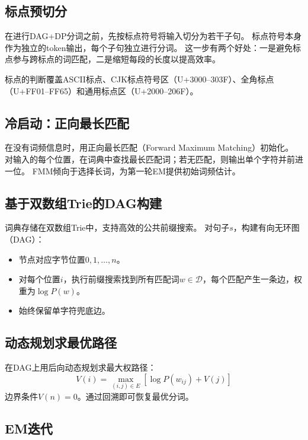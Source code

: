 \documentclass[11pt,a4paper]{article}
\begin{document}
\subsection{标点预切分}

在进行DAG+DP分词之前，先按标点符号将输入切分为若干子句。
标点符号本身作为独立的token输出，每个子句独立进行分词。
这一步有两个好处：一是避免标点参与跨标点的词匹配，二是缩短每段的长度以提高效率。

标点的判断覆盖ASCII标点、CJK标点符号区（U+3000--303F）、全角标点（U+FF01--FF65）和通用标点区（U+2000--206F）。

\subsection{冷启动：正向最长匹配}

在没有词频信息时，用正向最长匹配（Forward Maximum Matching）初始化。
对输入的每个位置，在词典中查找最长匹配词；若无匹配，则输出单个字符并前进一位。
FMM倾向于选择长词，为第一轮EM提供初始词频估计。

\subsection{基于双数组Trie的DAG构建}

词典存储在双数组Trie中，支持高效的公共前缀搜索。
对句子$s$，构建有向无环图（DAG）：
\begin{itemize}
    \item 节点对应字节位置$0, 1, \ldots, n$。
    \item 对每个位置$i$，执行前缀搜索找到所有匹配词$w \in \mathcal{D}$，每个匹配产生一条边，权重为$\log P(w)$。
    \item 始终保留单字符兜底边。
\end{itemize}

\subsection{动态规划求最优路径}

在DAG上用后向动态规划求最大权路径：
\begin{equation}
    V(i) = \max_{(i,j) \in E} \left[ \log P(w_{ij}) + V(j) \right]
\end{equation}
边界条件$V(n) = 0$。通过回溯即可恢复最优分词。

\subsection{EM迭代}
\end{document}
